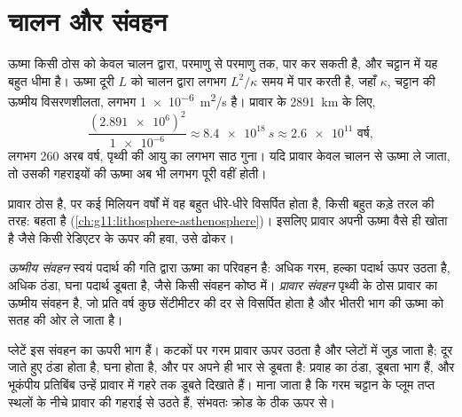 \section{चालन और संवहन}

ऊष्मा किसी ठोस को केवल चालन द्वारा, परमाणु से परमाणु तक, पार कर सकती है, और चट्टान में
यह बहुत धीमा है। ऊष्मा दूरी $L$ को चालन द्वारा लगभग
$L^2/\kappa$ समय में पार करती है, जहाँ $\kappa$, चट्टान की ऊष्मीय विसरणशीलता,
लगभग \qty{1e-6}{m^2/s} है। प्रावार के
\qty{2891}{km} के लिए,
\[
  \frac{(\num{2.891e6})^2}{\num{1e-6}} \approx \qty{8.4e18}{s} \approx
  \num{2.6e11} \text{ वर्ष},
\]
लगभग 260 अरब वर्ष, पृथ्वी की आयु का लगभग साठ गुना। यदि प्रावार
केवल चालन से ऊष्मा ले जाता, तो उसकी गहराइयों की ऊष्मा अब भी लगभग पूरी वहीं होती।

प्रावार ठोस है, पर कई मिलियन वर्षों में वह बहुत धीरे-धीरे विसर्पित होता है, किसी
बहुत कड़े तरल की तरह:  बहता है (\cref{ch:g11:lithosphere-asthenosphere})।
इसलिए प्रावार अपनी ऊष्मा वैसे ही खोता है जैसे किसी रेडिएटर के ऊपर की हवा, उसे ढोकर।

\begin{definition}\label{def:g12:internal-heat:convection}
\emph{ऊष्मीय संवहन} स्वयं पदार्थ की गति द्वारा ऊष्मा का
परिवहन है: अधिक गरम, हल्का पदार्थ ऊपर उठता है,
अधिक ठंडा, घना पदार्थ डूबता है, जैसे किसी संवहन कोष्ठ में।
\emph{प्रावार संवहन} पृथ्वी के ठोस प्रावार का ऊष्मीय
संवहन है, जो प्रति वर्ष कुछ सेंटीमीटर की दर से विसर्पित होता है और भीतरी भाग की
ऊष्मा को सतह की ओर ले जाता है।
\end{definition}

प्लेटें इस संवहन का ऊपरी भाग हैं। कटकों पर गरम प्रावार
ऊपर उठता है और प्लेटों में जुड़ जाता है; दूर जाते हुए  ठंडा होता है,
घना होता है, और  पर अपने ही भार से डूबता है: 
प्रवाह का ठंडा, डूबता भाग हैं, और भूकंपीय प्रतिबिंब उन्हें प्रावार में
गहरे तक डूबते दिखाते हैं। माना जाता है कि गरम चट्टान के प्लूम तप्त स्थलों के नीचे
प्रावार की गहराई से उठते हैं, संभवतः क्रोड के ठीक ऊपर से।

